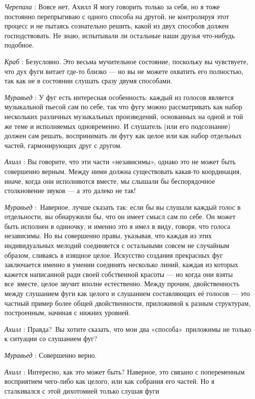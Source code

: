\emph{Черепаха} : Вовсе нет, Ахилл Я могу говорить только за себя, но я тоже постоянно перепрыгиваю с одного способа на другой, не контролируя этот процесс и не пытаясь сознательно решить, какой из двух способов должен господствовать. Не знаю, испытывали ли остальные наши друзья что-нибудь подобное.

\emph{Краб} : Безусловно. Это весьма мучительное состояние, поскольку вы чувствуете, что дух фуги витает где-то близко --- но вы не можете охватить его полностью, так как не в состоянии слушать сразу двумя способами.

\emph{Муравьед} : У фуг есть интересная особенность: каждый из голосов является музыкальной пьесой сам по себе, так что фугу можно рассматривать как набор нескольких различных музыкальных произведений, основанных на одной и той же теме и исполняемых одновременно. И слушатель (или его подсознание) должен сам решать, воспринимать ли фугу как целое или как набор отдельных частей, гармонирующих друг с другом.

\emph{Ахилл} : Вы говорите, что эти части «независимы», однако это не может быть совершенно верным. Между ними должна существовать какая-то координация, иначе, когда они исполняются вместе, мы слышали бы беспорядочное столкновение звуков --- а это далеко не так!

\emph{Муравьед} :~Наверное, лучше сказать так: если бы вы слушали каждый голос в отдельности, вы обнаружили бы, что он имеет смысл сам по себе. Он может быть исполнен в одиночку, и именно это я имел в виду, говоря, что голоса независимы. Но вы совершенно правы, указывая, что каждая из этих индивидуальных мелодий соединяется с остальными совсем не случайным образом, сливаясь в изящное целое. Искусство создания прекрасных фуг заключается именно в умении соединять несколько линий, каждая из которых кажется написанной ради своей собственной красоты --- но когда они взяты все~вместе, целое звучит вполне естественно. Между прочим, двойственность между слушанием фуги как целого и слушанием составляющих её голосов --- это частный пример более общей двойственности, приложимой к разным структурам, построенным, начиная с нижних уровней.

\emph{Ахилл} : Правда?~Вы хотите сказать, что мои два «способа»~приложимы не только к ситуации со слушанием фуг?

\emph{Муравьед} : Совершенно верно.

\emph{Ахилл} : Интересно, как это может быть? Наверное, это связано с попеременным восприятием чего-либо как целого, или как собрания его частей. Но я сталкивался с этой дихотомией только слушая фуги

